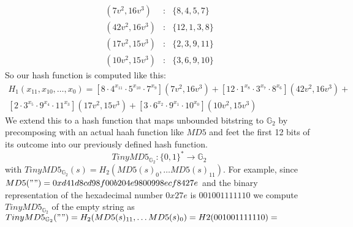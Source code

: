 $$
\begin{array}{lcl}
(7v^2 , 16v^3 ) &:& \{8,4,5,7\}\\
(42v^2 , 16v^3 ) &:& \{12,1,3,8\}\\
(17v^2 , 15v^3 ) &:& \{2,3,9,11\}\\
(10v^2 , 15v^3 ) &:& \{3,6,9,10\}
\end{array}
$$
So our hash function is computed like this:
\begin{multline*}
H_1(x_{11},x_{10},\ldots, x_{0})=
[8\cdot 4^{x_{11}}\cdot 5^{x_{10}}\cdot 7^{x_9}](7v^2 , 16v^3)+
[12\cdot 1^{x_8}\cdot 3^{x_7}\cdot 8^{x_6}](42v^2 , 16v^3 )+\\
[2\cdot 3^{x_5}\cdot 9^{x_4}\cdot 11^{x_3}](17v^2 , 15v^3 ) +
[3\cdot 6^{x_2}\cdot 9^{x_{1}}\cdot 10^{x_{0}}](10v^2 , 15v^3 )
\end{multline*}
We extend this to a hash function that maps unbounded bitstring to $\mathbb{G}_2$ by precomposing with an actual haah function like $MD5$ and feet the first 12 bits of its outcome into our previously defined hash function.
$$
TinyMD5_{\mathbb{G}_2}: \{0,1\}^* \to \mathbb{G}_2
$$
with $TinyMD5_{\mathbb{G}_2}(s)= H_2(MD5(s)_0,\ldots MD5(s)_{11})$. For example, since
$MD5("")= 0xd41d8cd98f00b204e9800998ecf8427e$ and the binary representation of the hexadecimal number $0x27e$ is $001001111110$ we compute $TinyMD5_{\mathbb{G}_2}$ of the empty string as
$TinyMD5_{\mathbb{G}_2}("")= H_2(MD5(s)_{11},\ldots MD5(s)_{0}) = H2(001001111110)=$







